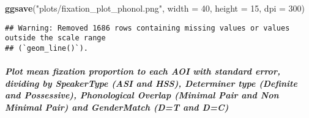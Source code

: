 \documentclass[
]{article}
\newenvironment{Shaded}{\begin{snugshade}}{\end{snugshade}}
\newcommand{\AttributeTok}[1]{\textcolor[rgb]{0.13,0.29,0.53}{#1}}
\newcommand{\DecValTok}[1]{\textcolor[rgb]{0.00,0.00,0.81}{#1}}
\newcommand{\FunctionTok}[1]{\textcolor[rgb]{0.13,0.29,0.53}{\textbf{#1}}}
\newcommand{\NormalTok}[1]{#1}
\newcommand{\StringTok}[1]{\textcolor[rgb]{0.31,0.60,0.02}{#1}}
\begin{document}
\begin{Shaded}
\begin{Highlighting}[]
\FunctionTok{ggsave}\NormalTok{(}\StringTok{"plots/fixation\_plot\_phonol.png"}\NormalTok{, }\AttributeTok{width =} \DecValTok{40}\NormalTok{, }\AttributeTok{height =} \DecValTok{15}\NormalTok{, }\AttributeTok{dpi =} \DecValTok{300}\NormalTok{)}
\end{Highlighting}
\end{Shaded}

\begin{verbatim}
## Warning: Removed 1686 rows containing missing values or values outside the scale range
## (`geom_line()`).
\end{verbatim}

\subparagraph{Plot mean fixation proportion to each AOI with standard
error, dividing by SpeakerType (ASI and HSS), Determiner type (Definite
and Possessive), Phonological Overlap (Minimal Pair and Non Minimal
Pair) and GenderMatch (D=T and
D=C)}\label{plot-mean-fixation-proportion-to-each-aoi-with-standard-error-dividing-by-speakertype-asi-and-hss-determiner-type-definite-and-possessive-phonological-overlap-minimal-pair-and-non-minimal-pair-and-gendermatch-dt-and-dc}
\end{document}
